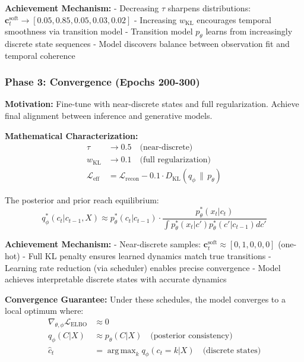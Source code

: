\documentclass[11pt]{article}
\DeclareMathOperator*{\argmax}{arg\,max}
\newcommand{\kl}[2]{D_{\text{KL}}\left(#1 \,\|\, #2\right)}
\begin{document}
\textbf{Achievement Mechanism:}
- Decreasing $\tau$ sharpens distributions: $\mathbf{c}_t^{\text{soft}} \to [0.05, 0.85, 0.05, 0.03, 0.02]$
- Increasing $w_{\text{KL}}$ encourages temporal smoothness via transition model
- Transition model $p_\theta$ learns from increasingly discrete state sequences
- Model discovers balance between observation fit and temporal coherence

\subsubsection{Phase 3: Convergence (Epochs 200-300)}

\textbf{Motivation:}
Fine-tune with near-discrete states and full regularization. Achieve final alignment between inference and generative models.

\textbf{Mathematical Characterization:}
\begin{align}
\tau &\to 0.5 \quad \text{(near-discrete)} \\
w_{\text{KL}} &\to 0.1 \quad \text{(full regularization)} \\
\mathcal{L}_{\text{eff}} &= \mathcal{L}_{\text{recon}} - 0.1 \cdot \kl{q_\phi}{p_\theta}
\end{align}

The posterior and prior reach equilibrium:
\begin{equation}
q_\phi^*(c_t|c_{t-1}, X) \approx p_\theta^*(c_t|c_{t-1}) \cdot \frac{p_\theta^*(x_t|c_t)}{\int p_\theta^*(x_t|c') p_\theta^*(c'|c_{t-1}) dc'}
\end{equation}

\textbf{Achievement Mechanism:}
- Near-discrete samples: $\mathbf{c}_t^{\text{soft}} \approx [0, 1, 0, 0, 0]$ (one-hot)
- Full KL penalty ensures learned dynamics match true transitions
- Learning rate reduction (via scheduler) enables precise convergence
- Model achieves interpretable discrete states with accurate dynamics

\textbf{Convergence Guarantee:}
Under these schedules, the model converges to a local optimum where:
\begin{align}
\nabla_{\theta,\phi} \mathcal{L}_{\text{ELBO}} &\approx 0 \\
q_\phi(C|X) &\approx p_\theta(C|X) \quad \text{(posterior consistency)} \\
\hat{c}_t &= \argmax_k q_\phi(c_t = k|X) \quad \text{(discrete states)}
\end{align}
\end{document}

